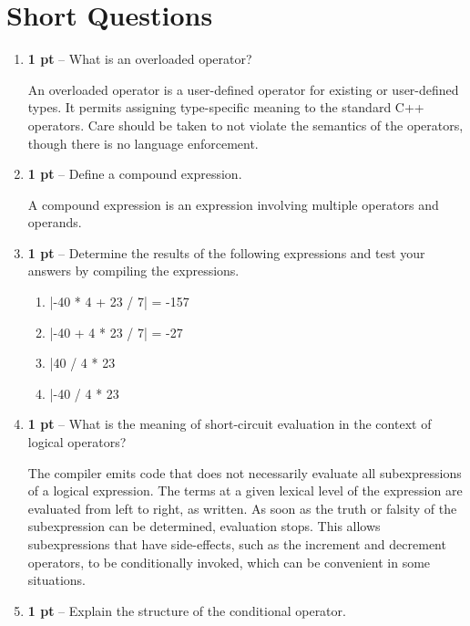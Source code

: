 \documentclass{article}
\begin{document}
\section*{Short Questions}
\begin{enumerate}
  \item \textbf{1 pt} -- What is an overloaded operator?

    An overloaded operator is a user-defined operator for existing or
    user-defined types.  It permits assigning type-specific meaning to the
    standard C++ operators.  Care should be taken to not violate the semantics
    of the operators, though there is no language enforcement.

  \item \textbf{1 pt} -- Define a compound expression.
    
    A compound expression is an expression involving multiple operators and
    operands.
    
  \item \textbf{1 pt} -- Determine the results of the following expressions and
    test your answers by compiling the expressions.

    \begin{enumerate}
      \item {}|-40 * 4 + 23 / 7| = -157
      \item {}|-40 + 4 * 23 / 7| =  -27
      \item {}|40 / 4 * 23 %
      \item {}|-40 / 4 * 23 %
    \end{enumerate}

  \item \textbf{1 pt} -- What is the meaning of short-circuit evaluation in the
    context of logical operators?

    The compiler emits code that does not necessarily evaluate all
    subexpressions of a logical expression.  The terms at a given
    lexical level of the expression are evaluated from left to right,
    as written.  As soon as the truth or falsity of the subexpression
    can be determined, evaluation stops.  This allows subexpressions
    that have side-effects, such as the increment and decrement
    operators, to be conditionally invoked, which can be convenient in
    some situations.

  \item \textbf{1 pt} -- Explain the structure of the conditional operator.
      

\end{enumerate}
\end{document}
